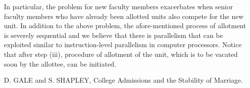 \documentclass[a4paper,10pt]{article}
\begin{document}
%
In particular, the problem for new faculty members exacerbates when
senior faculty members who have already been allotted units also
compete for the new unit.
%
In addition to the above problem, the afore-mentioned process of
allotment is severely sequential and we believe that there is
parallelism that can be exploited similar to instruction-level
parallelism in computer processors. Notice that after step (iii),
procedure of allotment of the unit, which is to be vacated soon by the
allottee, can be initiated.





\begin{thebibliography}{9}
D. GALE and S. SHAPLEY, 
College Admissions and the Stability of Marriage. 

\end{thebibliography}
\end{document}
